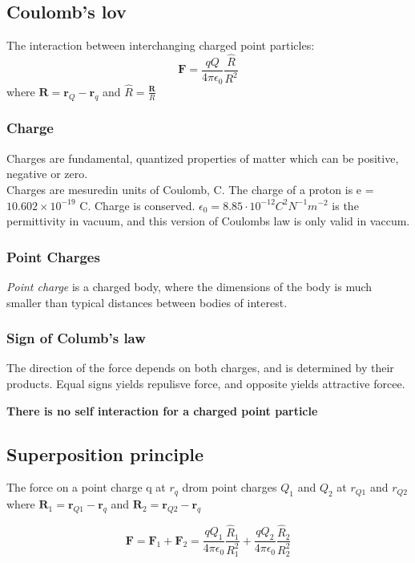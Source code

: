 \documentclass[
12pt, reprint, aip, onecolumn, notitlepage
]{revtex4-1}
\begin{document}
\subsection{Coulomb's lov}
The interaction between interchanging charged point particles:
\begin{equation}
	\mathbf{F}=\frac{q Q}{4 \pi \epsilon_{0}} \frac{\hat{R}}{R^{2}}
\end{equation}
where $\mathbf{R}=\mathbf{r}_{Q}-\mathbf{r}_{q}$ and $\hat{R}=\frac{\mathbf{R}}{R}$

\subsubsection{Charge}

Charges are fundamental, quantized properties of matter which can be positive, negative or zero. \\
Charges are mesuredin units of Coulomb, C. 
The charge of a proton is e = $10.602\times 10^{-19}$ C.
Charge is conserved. 
$\epsilon_0 = 8.85 \cdot 10^{-12} C^2N^{-1}m^{-2}$ is the permittivity in vacuum, and this version of Coulombs law is only valid in vaccum. 

\subsubsection{Point Charges}
\textit{Point charge} is a charged body, where the dimensions of the body is much smaller than typical distances between bodies of interest. 

\subsubsection{Sign of Columb's law}
The direction of the force depends on both charges, and is determined by their products. Equal signs yields repulisve force, and opposite yields attractive forcee.

\textbf{There is no self interaction for a charged point particle}

\subsection{Superposition principle}

The force on a point charge q at $r_q$ drom point charges $Q_1$ and $Q_2$ at $r_{Q1}$ and $r_{Q2}$ where $\mathbf{R}_{1}=\mathbf{r}_{Q 1}-\mathbf{r}_{q}$ and $\mathbf{R}_{2}=\mathbf{r}_{Q 2}-\mathbf{r}_{q}$

\begin{equation}
\mathbf{F}=\mathbf{F}_{1}+\mathbf{F}_{2}=\frac{q Q_{1}}{4 \pi \epsilon_{0}} \frac{\hat{R}_{1}}{R_{1}^{2}}+\frac{q Q_{2}}{4 \pi \epsilon_{0}} \frac{\hat{R}_{2}}{R_{2}^{2}}
\end{equation}
\end{document}
